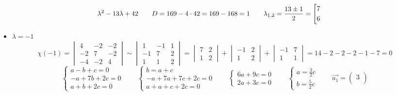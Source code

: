 $$ \lambda^2 - 13\lambda + 42 \qquad D = 169 - 4 \cdot 42 = 169 - 168 = 1 \qquad \lambda_{1, 2} = \half[13 \pm 1] = \left[
\begin{aligned}
	7 \\
    6
\end{aligned} \right. $$
\begin{itemize}
	\item $ \lambda = -1 $
    $$ \chi(-1) =
    \begin{vmatrix}
    	4 & -2 & -2 \\
        -2 & 7 & -2 \\
        -4 & -2 & 4
    \end{vmatrix} \sim
    \begin{vmatrix}
    	1 & -1 & 1 \\
        -1 & 7 & 2 \\
        1 & 1 & 2
    \end{vmatrix} =
    \begin{vmatrix}
    	7 & 2 \\
        1 & 2
    \end{vmatrix} +
    \begin{vmatrix}
    	-1 & 2 \\
        1 & 2
    \end{vmatrix} +
    \begin{vmatrix}
    	-1 & 7 \\
        1 & 1
    \end{vmatrix} = 14 - 2 - 2 - 2 - 1 - 7 = 0 $$
    $$
    \begin{cases}
    	a - b + c = 0 \\
        -a + 7b + 2c = 0 \\
        a + b + 2c = 0
    \end{cases} \qquad
    \begin{cases}
    	b = a + c \\
        -a + 7a + 7c + 2c = 0 \\
        a + a + c + 2c = 0
    \end{cases} \qquad
    \begin{cases}
    	6a + 9c = 0 \\
        2a + 3c = 0
    \end{cases} \qquad
    \begin{cases}
    	a = \frac32c \\
        b = \frac52c
    \end{cases} \qquad \vec{u_1} =
    \begin{pmatrix}
    	3 \\

\end{pmatrix}$$
\end{itemize}
